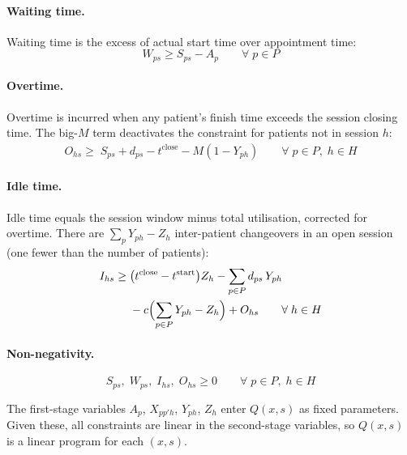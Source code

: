 \paragraph{Waiting time.}
Waiting time is the excess of actual start time over appointment time:
%
\begin{equation}
  W_{ps} \geq S_{ps} - A_p
  \qquad \forall\; p \in P
  \label{eq:rc_wait}
\end{equation}
 
\paragraph{Overtime.}
Overtime is incurred when any patient's finish time exceeds the session closing
time. The big-$M$ term deactivates the constraint for patients not in session
$h$:
%
\begin{align}
  O_{hs} \geq\; S_{ps} + d_{ps} - t^{\text{close}} - M(1 - Y_{ph})
  \qquad \forall\; p \in P,\; h \in H
  \label{eq:rc_ot}
\end{align}
 
\paragraph{Idle time.}
Idle time equals the session window minus total utilisation, corrected for
overtime. There are $\sum_{p}Y_{ph} - Z_h$ inter-patient changeovers in an
open session (one fewer than the number of patients):
%
\begin{align}
  I_{hs} \geq\; & \bigl(t^{\text{close}} - t^{\text{start}}\bigr) Z_h
                  - \sum_{p \in P} d_{ps}\, Y_{ph} \nonumber \\
                & - c\Bigl(\sum_{p \in P} Y_{ph} - Z_h\Bigr)
                  + O_{hs}
  \qquad \forall\; h \in H
  \label{eq:rc_idle}
\end{align}
 
\paragraph{Non-negativity.}
%
\begin{equation}
  S_{ps},\; W_{ps},\; I_{hs},\; O_{hs} \geq 0
  \qquad \forall\; p \in P,\; h \in H
  \label{eq:rc_nn}
\end{equation}
 
\noindent The first-stage variables $A_p$, $X_{pp'h}$, $Y_{ph}$, $Z_h$ enter
$Q(x,s)$ as fixed parameters. Given these, all constraints are linear in the
second-stage variables, so $Q(x, s)$ is a linear program for each $(x, s)$.
 
